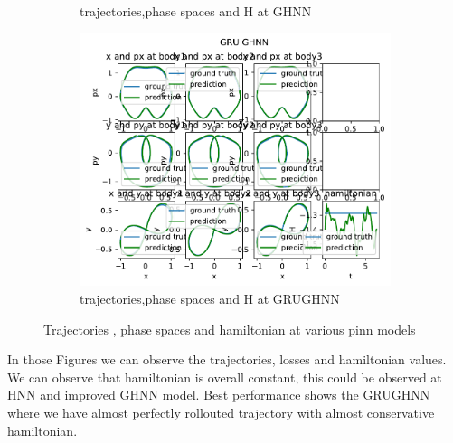 \begin{figure}[H]
\begin{subfigure}[b]{0.3\textwidth}
		\caption{trajectories,phase spaces and H at GHNN}
		\label{fig:image5}
	\end{subfigure}
	\hfill
	\begin{subfigure}[b]{0.3\textwidth}
		\centering
		\includegraphics[width=\textwidth]{chapters/chapter5/figonly_gru_ghnn_traj.pdf}
		\caption{trajectories,phase spaces and H at GRUGHNN}
		\label{fig:image6}
	\end{subfigure}
	
	\caption{Trajectories , phase spaces and hamiltonian at various pinn models}
	\label{div_traj}
\end{figure}
In those Figures we can observe the trajectories, losses and hamiltonian values.
We can observe that hamiltonian is overall constant, this could be observed at HNN and improved GHNN model. Best performance shows the GRUGHNN where we have almost perfectly rollouted trajectory with almost conservative hamiltonian.

